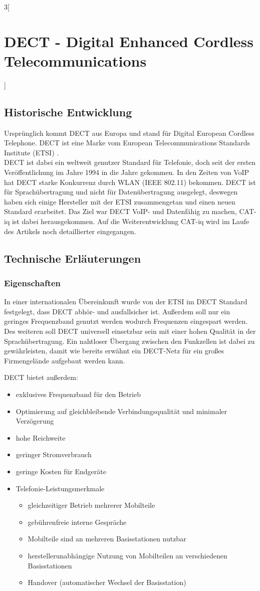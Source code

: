 \begin{multicols}{3}[\section{DECT - Digital Enhanced Cordless Telecommunications}]
\subsection*{Historische Entwicklung}
Ursprünglich kommt DECT aus Europa und stand für Digital European Cordless Telephone. DECT ist eine Marke vom  European Telecommunications Standards Institute (ETSI) \cite{dect.4}.
\\DECT ist dabei ein weltweit genutzer Standard für Telefonie, doch seit der ersten Veröffentlichung im Jahre 1994 in die Jahre gekommen. In den Zeiten von VoIP hat DECT starke Konkurrenz durch WLAN (IEEE 802.11) bekommen. DECT ist für Sprachübertragung und nicht für Datenübertragung ausgelegt, deswegen haben sich einige Hersteller mit der ETSI zusammengetan und einen neuen Standard erarbeitet. Das Ziel war DECT VoIP- und Datenfähig zu machen, CAT-iq ist dabei herausgekommen. Auf die Weiterentwicklung CAT-iq wird im Laufe des Artikels noch detaillierter eingegangen.
\subsection*{Technische Erläuterungen}
\subsubsection*{Eigenschaften}
In einer internationalen Übereinkunft wurde von der ETSI im DECT Standard festgelegt, dass DECT abhör- und ausfallsicher ist. Außerdem soll nur ein geringes Frequenzband genutzt werden wodurch Frequenzen eingespart werden. Des weiteren soll DECT universell einsetzbar sein mit einer hohen Qualität in der Sprachübertragung. Ein nahtloser Übergang zwischen den Funkzellen ist dabei zu gewährleisten, damit wie bereits erwähnt ein DECT-Netz für ein großes Firmengelände aufgebaut werden kann.

DECT bietet außerdem:
\begin{itemize}
	\item exklusives Frequenzband für den Betrieb
	\item Optimierung auf gleichbleibende Verbindungsqualität und minimaler Verzögerung
	\item hohe Reichweite
	\item geringer Stromverbrauch
	\item geringe Kosten für Endgeräte
	\item Telefonie-Leistungsmerkmale
	\begin{itemize}
		\item gleichzeitiger Betrieb mehrerer Mobilteile
		\item gebührenfreie interne Gespräche
		\item Mobilteile sind an mehreren Basisstationen nutzbar
		\item herstellerunabhängige Nutzung von Mobilteilen an verschiedenen Basisstationen
		\item Handover (automatischer Wechsel der Basisstation)
	\end{itemize}
\end{itemize}
\cite{dect.1}


\end{multicols}
